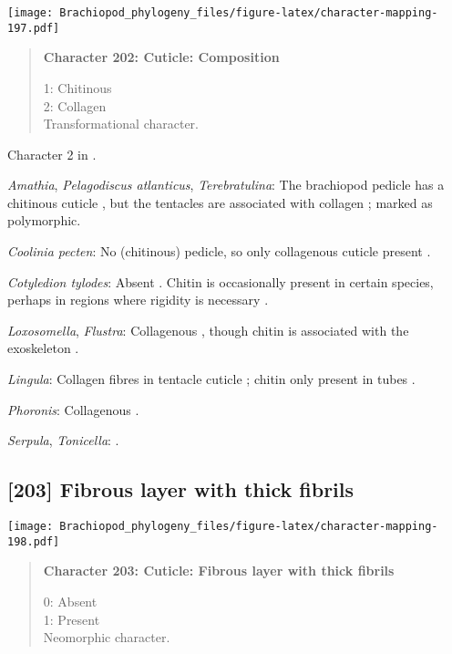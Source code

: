 \documentclass[openany]{book}
\theoremstyle{definition}
\theoremstyle{definition}
\theoremstyle{definition}
\theoremstyle{remark}
\begin{document}
\texttt{[image: Brachiopod\_phylogeny\_files/figure-latex/character-mapping-197.pdf]}

\begin{quote}
\textbf{Character 202: Cuticle: Composition}

1: Chitinous\\
2: Collagen\\
Transformational character.
\end{quote}

Character 2 in \citet{Haszprunar2008}.

\hypertarget{Amathia-coding-202}{}
\emph{Amathia}, \emph{Pelagodiscus atlanticus}, \emph{Terebratulina}:
The brachiopod pedicle has a chitinous cuticle
\citep{Williams1997Introduction, MacKay1978}, but the tentacles are
associated with collagen \citep{Williams1997Introduction}; marked as
polymorphic.

\hypertarget{Coolinia_pecten-coding-202}{}
\emph{Coolinia pecten}: No (chitinous) pedicle, so only collagenous
cuticle present \citep{Williams1997Introduction}.

\hypertarget{Cotyledion_tylodes-coding-202}{}
\emph{Cotyledion tylodes}: Absent \citep{Haszprunar2008}. Chitin is
occasionally present in certain species, perhaps in regions where
rigidity is necessary \citep{Borisanova2015}.

\hypertarget{Flustra-coding-202}{}
\emph{Loxosomella}, \emph{Flustra}: Collagenous \citep{Schopf1967},
though chitin is associated with the exoskeleton \citep{Hunt1972}.

\hypertarget{Lingula-coding-202}{}
\emph{Lingula}: Collagen fibres in tentacle cuticle
\citep{Bartolomaeus2001U}; chitin only present in tubes
\citep{Jeuniaux1971}.

\hypertarget{Phoronis-coding-202}{}
\emph{Phoronis}: Collagenous \citep{Goffinet1978}.

\hypertarget{Serpula-coding-202}{}
\emph{Serpula}, \emph{Tonicella}: \citet{Haszprunar2008}.

\subsection*{{[}203{]} Fibrous layer with thick
fibrils}\label{fibrous-layer-with-thick-fibrils}

\texttt{[image: Brachiopod\_phylogeny\_files/figure-latex/character-mapping-198.pdf]}

\begin{quote}
\textbf{Character 203: Cuticle: Fibrous layer with thick fibrils}

0: Absent\\
1: Present\\
Neomorphic character.
\end{quote}
\end{document}
